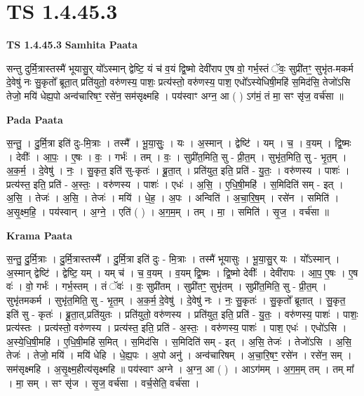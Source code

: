 \documentclass[17pt]{extarticle}
\begin{document}
\section{ TS 1.4.45.3 }

\textbf{TS 1.4.45.3 } \newline
\textbf{Samhita Paata} \newline

सन्तु दुर्मि॒त्रास्तस्मै॑ भूयासु॒र् यो᳚ऽस्मान् द्वेष्टि॒ यं च॑ व॒यं द्वि॒ष्मो देवी॑राप ए॒ष वो॒ गर्भ॒स्तं ॅवः॒ सुप्री॑तꣳ॒॒ सुभृ॑त-मकर्म दे॒वेषु॑ नः सु॒कृतो᳚ ब्रूता॒त् प्रति॑युतो॒ वरु॑णस्य॒ पाशः॒ प्रत्य॑स्तो॒ वरु॑णस्य॒ पाश॒ एधो᳚ऽस्येधिषी॒महि॑ स॒मिद॑सि॒ तेजो॑ऽसि तेजो॒ मयि॑ धेह्य॒पो अन्व॑चारिषꣳ॒॒ रसे॑न॒ सम॑सृक्ष्महि । पय॑स्वाꣳ अग्न॒ आ ( ) ऽग॑मं॒ तं मा॒ सꣳ सृ॑ज॒ वर्च॑सा ॥ \newline

\textbf{Pada Paata} \newline

स॒न्तु॒ । दु॒र्मि॒त्रा इति॑ दुः-मि॒त्राः । तस्मै᳚ । भू॒या॒सुः॒ । यः । अ॒स्मान् । द्वेष्टि॑ । यम् । च॒ । व॒यम् । द्वि॒ष्मः । देवीः᳚ । आ॒पः॒ । ए॒षः । वः॒ । गर्भः॑ । तम् । वः॒ । सुप्री॑त॒मिति॒ सु - प्री॒त॒म् । सुभृ॑त॒मिति॒ सु - भृ॒त॒म् । अ॒क॒र्म॒ । दे॒वेषु॑ । नः॒ । सु॒कृत॒ इति॑ सु-कृतः॑ । ब्रू॒ता॒त् । प्रति॑युत॒ इति॒ प्रति॑ - यु॒तः॒ । वरु॑णस्य । पाशः॑ । प्रत्य॑स्त॒ इति॒ प्रति॑ - अ॒स्तः॒ । वरु॑णस्य । पाशः॑ । एधः॑ । अ॒सि॒ । ए॒धि॒षी॒महि॑ । स॒मिदिति॑ सम् - इत् । अ॒सि॒ । तेजः॑ । अ॒सि॒ । तेजः॑ । मयि॑ । धे॒ह॒ । अ॒पः । अन्विति॑ । अ॒चा॒रि॒ष॒म् । रसे॑न । समिति॑ । अ॒सृ॒क्ष्म॒हि॒ । पय॑स्वान् । अ॒ग्ने॒ । एति॑ ( ) । अ॒ग॒म॒म् । तम् । मा॒ । समिति॑ । सृ॒ज॒ । वर्च॑सा ॥  \newline


\textbf{Krama Paata} \newline

स॒न्तु॒ दु॒र्मि॒त्राः । दु॒र्मि॒त्रास्तस्मै᳚ । दु॒र्मि॒त्रा इति॑ दुः - मि॒त्राः । तस्मै॑ भूयासुः । भू॒या॒सु॒र् यः । 
यो᳚ऽस्मान् । अ॒स्मान् द्वेष्टि॑ । द्वेष्टि॒ यम् । यम् च॑ । च॒ व॒यम् । व॒यम् द्वि॒ष्मः । द्वि॒ष्मो देवीः᳚ । देवी॑रापः । आ॒प॒ ए॒षः । ए॒ष वः॑ । वो॒ गर्भः॑ । गर्भ॒स्तम् । तं ॅवः॑ । वः॒ सुप्री॑तम् । सुप्री॑तꣳ॒॒ सुभृ॑तम् । सुप्री॑त॒मिति॒ सु - प्री॒त॒म् । सुभृ॑तमकर्म । सुभृ॑त॒मिति॒ सु - भृ॒त॒म् । अ॒क॒र्म॒ दे॒वेषु॑ । दे॒वेषु॑ नः । नः॒ सु॒कृतः॑ । सु॒कृतो᳚ ब्रूतात् । सु॒कृत॒ इति॑ सु - कृतः॑ । ब्रू॒ता॒त्,प्रति॑युतः । प्रति॑युतो॒ वरु॑णस्य । प्रति॑युत॒ इति॒ प्रति॑ - यु॒तः॒ । वरु॑णस्य॒ पाशः॑ । पाशः॒ प्रत्य॑स्तः । प्रत्य॑स्तो॒ वरु॑णस्य । प्रत्य॑स्त॒ इति॒ प्रति॑ - अ॒स्तः॒ । वरु॑णस्य॒ पाशः॑ । पाश॒ एधः॑ । एधो॑ऽसि । अ॒स्ये॒धि॒षी॒महि॑ । ए॒धि॒षी॒महि॑ स॒मित् । स॒मिद॑सि । स॒मिदिति॑ सम् - इत् । अ॒सि॒ तेजः॑ । तेजो॑ऽसि । अ॒सि॒ तेजः॑ । तेजो॒ मयि॑ । मयि॑ धेहि । धे॒ह्य॒पः । अ॒पो अनु॑ । अन्व॑चारिषम् । अ॒चा॒रि॒षꣳ॒॒ रसे॑न । रसे॑न॒ सम् । सम॑सृक्ष्महि । अ॒सृ॒क्ष्म॒हीत्य॑सृक्ष्महि ॥ पय॑स्वाꣳ अग्ने । अ॒ग्न॒ आ ( ) । आऽग॑मम् । अ॒ग॒म॒म् तम् । तम् मा᳚ । मा॒ सम् । सꣳ सृ॑ज । सृ॒ज॒ वर्च॑सा । वर्च॒सेति॒ वर्च॑सा । \newline
\end{document}

